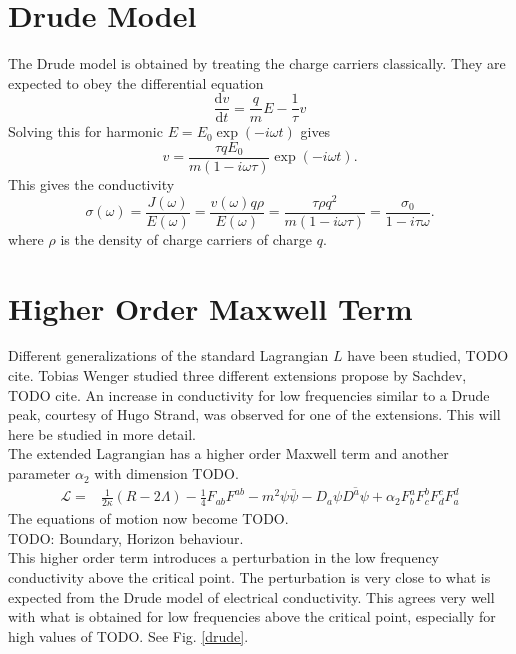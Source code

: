 \documentclass[12pt]{report}
\renewcommand{\d}{\ensuremath{\mathrm{d}}}
\renewcommand{\i}{\ensuremath{i}}
\begin{document}
\section{Drude Model}
The Drude model is obtained by treating the charge carriers classically. They are expected to obey the differential equation
\begin{equation}
 \frac{\d v}{\d t}=\frac{q}{m}E-\frac{1}{\tau}v
\end{equation}
Solving this for harmonic $E=E_0\exp(-\i\omega t)$ gives 
\begin{equation}
 v=\frac{\tau qE_0}{m(1-\i\omega\tau)}\exp(-\i\omega t).
\end{equation}
This gives the conductivity
\begin{equation}
 \sigma(\omega)=\frac{J(\omega)}{E(\omega)}=\frac{v(\omega)q\rho}{E(\omega)}=\frac{\tau\rho q^2}{m(1-\i\omega\tau)}=\frac{\sigma_0}{1-\i\tau\omega}.
\end{equation}
where $\rho$ is the density of charge carriers of charge $q$.
\section{Higher Order Maxwell Term}
Different generalizations of the standard Lagrangian $L$ have been studied, TODO cite. Tobias Wenger studied three different extensions propose by Sachdev, TODO cite. An increase in conductivity for low frequencies similar to a Drude peak, courtesy of Hugo Strand, was observed for one of the extensions. This will here be studied in more detail.\\
The extended Lagrangian has a higher order Maxwell term and another parameter $\alpha_2$ with dimension TODO.
\begin{eqnarray}
 \mathcal{L}=&\frac{1}{2\kappa}\left(R-2\Lambda\right)-\frac{1}{4}F_{ab}F^{ab}-m^2\psi\overline{\psi}-D_a\psi\overline{D^a\psi}
+\alpha_2F^a_bF^b_cF^c_dF^d_a\label{L2}
\end{eqnarray}
The equations of motion now become TODO.\\
TODO: Boundary, Horizon behaviour.\\

This higher order term introduces a perturbation in the low frequency conductivity above the critical point. The perturbation is very close to what is expected from the Drude model of electrical conductivity. 
This agrees very well with what is obtained for low frequencies above the critical point, especially for high values of TODO. See Fig. \ref{drude}.
\end{document}
